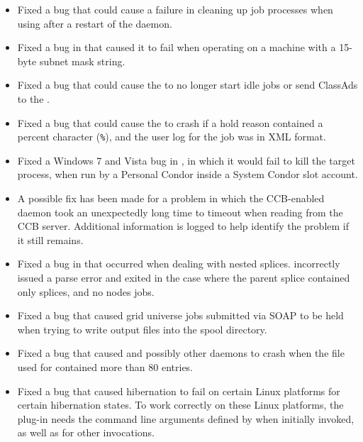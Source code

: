 \begin{itemize}
\item Fixed a bug that could cause a failure in cleaning up job processes
when using  after a restart of the  daemon.

\item Fixed a bug in  that caused it to fail when
operating on a machine with a 15-byte subnet mask string.

\item Fixed a bug that could cause the  to no longer start
idle jobs or send ClassAds to the .

\item Fixed a bug that could cause the  to crash if a
hold reason contained a percent character (\verb|%|),
and the user log for the job was in XML format.

\item Fixed a Windows 7 and Vista bug in ,
in which it would fail to kill the target process,
when run by a Personal Condor inside a System Condor slot account.

\item A possible fix has been made for a problem in which the
CCB-enabled daemon took an unexpectedly long time to timeout when
reading from the CCB server.  Additional information is logged
to help identify the problem if it still remains.

\item Fixed a bug in  that occurred when 
dealing with nested splices.
 incorrectly issued a parse error and exited
in the case where the parent splice contained only splices, and no nodes jobs.

\item Fixed a bug that caused grid universe jobs submitted via SOAP to
be held when trying to write output files into the spool directory.

\item Fixed a bug that caused  and possibly other
daemons to crash when the file used for 
contained more than 80 entries.

\item Fixed a bug that caused hibernation to fail on certain Linux platforms
for certain hibernation states.
To work correctly on these Linux platforms,
the plug-in needs the command line arguments defined by
 when initially invoked, 
as well as for other invocations.  


\end{itemize}
